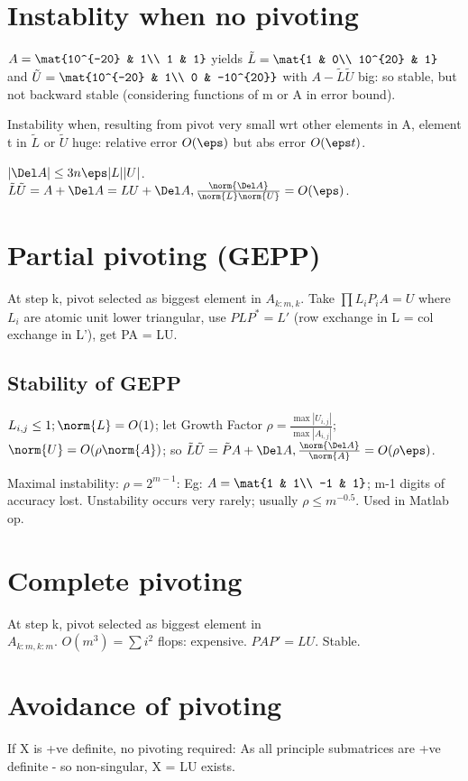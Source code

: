 \documentclass[oneside, article]{memoir}
\begin{document}
\section{Instablity when no pivoting}
$A=\mat{10^{-20} & 1\\ 1 & 1}$ yields $\tilde{L}=\mat{1 & 0\\ 10^{20} & 1}$ and $\tilde{U}=\mat{10^{-20} & 1\\ 0 & -10^{20}}$ with $A-\tilde{L}\tilde{U}$ big: so stable, but not backward stable (considering functions of m or A in error bound).

Instability when, resulting from pivot very small wrt other elements in A, element t in $\tilde{L}$ or $\tilde{U}$ huge: relative error $O(\eps)$ but abs error $O(\eps t)$.

$|\Del A| \leq 3n\eps|L||U|$. \why $\tilde{L}\tilde{U} = A + \Del A =LU + \Del A, \frac{\norm{\Del A}}{\norm{L}\norm{U}} = O(\eps)$.

\section{Partial pivoting (GEPP)}
At step k, pivot selected as biggest element in $A_{k:m,k}$. Take $\prod L_{i}P_{i}A = U$ where $L_{i}$ are atomic unit lower triangular, use $PLP^{*} = L'$ (row exchange in L = col exchange in L'), get PA = LU.

\subsection{Stability of GEPP}
$L_{i,j} \leq 1; \norm{L} =O(1)$; let Growth Factor $\rho = \frac{\max |U_{i,j}|}{\max |A_{i,j}|}$; $\norm{U} = O(\rho \norm{A})$; so $\tilde{L}\tilde{U} = \tilde{P}A + \Del A, \frac{\norm{\Del A}}{\norm{A}} = O(\rho \eps)$.

Maximal instability: $\rho = 2^{m-1}$: Eg: $A=\mat{1 & 1\\ -1 & 1}$; m-1 digits of accuracy lost. Unstability occurs very rarely; usually $\rho \leq m^{-0.5}$. Used in Matlab \\ op.

\section{Complete pivoting}
At step k, pivot selected as biggest element in \\
$A_{k:m,k:m}$. $O(m^{3}) = \sum i^{2}$ flops: expensive. $PAP' = LU$. Stable.

\section{Avoidance of pivoting}
If X is +ve definite, no pivoting required: As all principle submatrices are +ve definite - so non-singular, X = LU exists.
\end{document}
